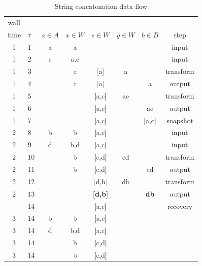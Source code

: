 \begin{table}[!b]
\begin {center}
\caption{String concatenation data flow}   
\begin{tabular}{c|l|c|c|c|c|c|c}      
wall\\ time & $\tau$& $a\in A$  &$x\in W$& $s\in W$ & $y\in W$ & $b \in B$ & step  \\
\hline
1   &   1   &   a   &   a           &           &       &           &   input \\
1   &   2   &   c   &   a,c         &           &       &           &   input \\
1   &   3   &       &    c          &   [a]     &    a  &           &   transform \\
1   &   4   &       &   c           &   [a]     &       &   a       &   output \\
1   &   5   &       &               &   [a,c]   &   ac  &           &   transform \\
1   &   6   &       &               &   [a,c]   &       &   ac       &   output \\
1   &   7   &       &               &   [a,c]   &       &   [a,c]   &   snapshot \\
2   &   8   &   b    &   b          &   [a,c]   &       &           &   input \\
2   &   9   &   d    &   b,d        &   [a,c]   &       &           &   input \\
2   &   10   &       &   b          &   [c,d]   &  cd   &           &   transform \\
2   &   11   &       &   b          &   [c,d]   &       &      cd     &   output \\
2   &   12   &       &              &   [d,b]    &  db   &           &   transform \\
2   &   13   &       &              &   {\bf [d,b]}    &       &      {\bf db}     &   output \\
\arrayrulecolor{red}\hline
3   &   14   &       &               &   [a,c]         &       &           &   recovery \\
3   &   14   &   b   &   b           &   [a,c]         &       &           &   \\
3   &   14   &   d   &   b,d         &   [a,c]         &       &           &   \\
3   &   14   &       &   b           &   [c,d]         &       &           &   \\
3   &   14   &       &   b           &   [c,d]         &       &           &   \\

\end{tabular}
\end{center}
\end{table}
